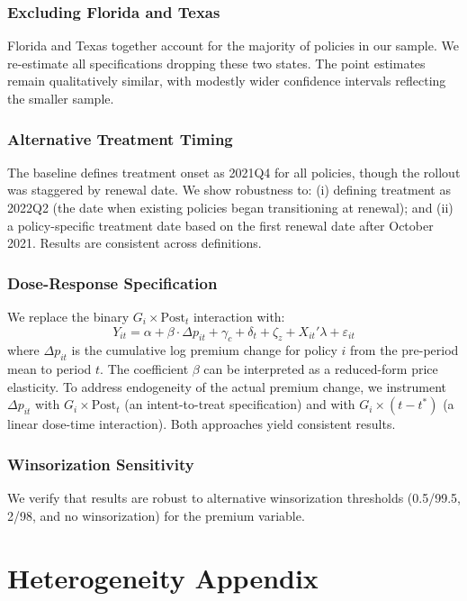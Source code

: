 \documentclass[12pt]{article}
\begin{document}
\subsubsection*{Excluding Florida and Texas} Florida and Texas together account for the majority of policies in our sample. We re-estimate all specifications dropping these two states. The point estimates remain qualitatively similar, with modestly wider confidence intervals reflecting the smaller sample.

\subsubsection*{Alternative Treatment Timing} The baseline defines treatment onset as 2021Q4 for all policies, though the rollout was staggered by renewal date. We show robustness to: (i) defining treatment as 2022Q2 (the date when existing policies began transitioning at renewal); and (ii) a policy-specific treatment date based on the first renewal date after October 2021. Results are consistent across definitions.

\subsubsection*{Dose-Response Specification} We replace the binary $G_i \times \text{Post}_t$ interaction with:
\begin{equation}
Y_{it} = \alpha + \beta \cdot \Delta p_{it} + \gamma_c + \delta_t + \zeta_z + X_{it}'\lambda + \varepsilon_{it}
\end{equation}
where $\Delta p_{it}$ is the cumulative log premium change for policy $i$ from the pre-period mean to period $t$. The coefficient $\beta$ can be interpreted as a reduced-form price elasticity. To address endogeneity of the actual premium change, we instrument $\Delta p_{it}$ with $G_i \times \text{Post}_t$ (an intent-to-treat specification) and with $G_i \times (t - t^*)$ (a linear dose-time interaction). Both approaches yield consistent results.

\subsubsection*{Winsorization Sensitivity} We verify that results are robust to alternative winsorization thresholds (0.5/99.5, 2/98, and no winsorization) for the premium variable.


\section{Heterogeneity Appendix}
\label{app:heterogeneity}
\end{document}
